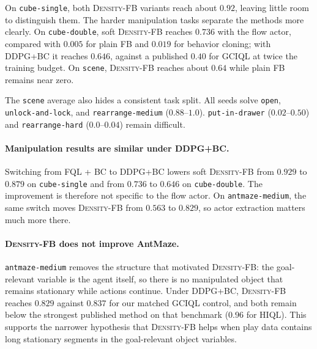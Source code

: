 \documentclass{article}
\newcommand{\DensityFB}{\textsc{Density-FB}}
\begin{document}
On \texttt{cube-single}, both \DensityFB{} variants reach about $0.92$, leaving little room to distinguish them.
The harder manipulation tasks separate the methods more clearly.
On \texttt{cube-double}, soft \DensityFB{} reaches $0.736$ with the flow actor, compared with $0.005$ for plain FB and $0.019$ for behavior cloning; with DDPG+BC it reaches $0.646$, against a published $0.40$ for GCIQL at twice the training budget.
On \texttt{scene}, \DensityFB{} reaches about $0.64$ while plain FB remains near zero.

The \texttt{scene} average also hides a consistent task split.
All seeds solve \texttt{open}, \texttt{unlock-and-lock}, and \texttt{rearrange-medium} ($0.88$--$1.0$).
\texttt{put-in-drawer} ($0.02$--$0.50$) and \texttt{rearrange-hard} ($0.0$--$0.04$) remain difficult.

\paragraph{Manipulation results are similar under DDPG+BC.}
Switching from FQL + BC to DDPG+BC lowers soft \DensityFB{} from $0.929$ to $0.879$ on \texttt{cube-single} and from $0.736$ to $0.646$ on \texttt{cube-double}.
The improvement is therefore not specific to the flow actor.
On \texttt{antmaze-medium}, the same switch moves \DensityFB{} from $0.563$ to $0.829$, so actor extraction matters much more there.

\paragraph{\DensityFB{} does not improve AntMaze.}
\texttt{antmaze-medium} removes the structure that motivated \DensityFB{}: the goal-relevant variable is the agent itself, so there is no manipulated object that remains stationary while actions continue.
Under DDPG+BC, \DensityFB{} reaches $0.829$ against $0.837$ for our matched GCIQL control, and both remain below the strongest published method on that benchmark ($0.96$ for HIQL).
This supports the narrower hypothesis that \DensityFB{} helps when play data contains long stationary segments in the goal-relevant object variables.
\end{document}
